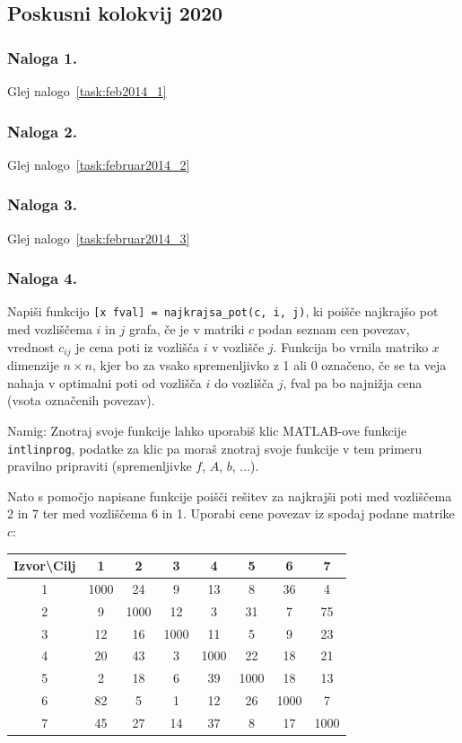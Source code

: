 \documentclass[a4paper,11pt]{article}
\begin{document}
\subsection{Poskusni kolokvij 2020}

\subsubsection{Naloga 1.}

Glej nalogo~\ref{task:feb2014_1}

\subsubsection{Naloga 2.}

Glej nalogo~\ref{task:februar2014_2}

\subsubsection{Naloga 3.}

Glej nalogo~\ref{task:februar2014_3}

\subsubsection{Naloga 4.}

Napiši funkcijo \texttt{[x fval] = najkrajsa\_pot(c, i, j)}, ki poišče najkrajšo pot med vozliščema $i$ in $j$ grafa, če je v matriki $c$ podan seznam cen povezav, vrednost $c_{ij}$ je cena poti iz vozlišča $i$ v vozlišče $j$. Funkcija bo vrnila matriko $x$ dimenzije $n\times n$, kjer bo za vsako spremenljivko z 1 ali 0 označeno, če se ta veja nahaja v optimalni poti od vozlišča $i$ do vozlišča $j$, fval pa bo najnižja cena (vsota označenih povezav).

Namig: Znotraj svoje funkcije lahko uporabiš klic MATLAB-ove funkcije \texttt{intlinprog}, podatke za klic pa moraš znotraj svoje funkcije v tem primeru pravilno pripraviti (spremenljivke $f$, $A$, $b$, ...).

Nato s pomočjo napisane funkcije poišči rešitev za najkrajši poti med vozliščema 2 in 7 ter med vozliščema 6 in 1. Uporabi cene povezav iz spodaj podane matrike $c$:

\begin{table}[hbt] \centering
\begin{tabular}{| c |  c |  c |  c |  c |  c |  c |  c | }
\hline
Izvor\textbackslash Cilj & 1 & 2 & 3 & 4 & 5 & 6 & 7 \\
\hline
1 & 1000 & 24 & 9 & 13 & 8 & 36 & 4 \\
\hline
2 & 9 & 1000 & 12 & 3 & 31 & 7 & 75 \\
\hline
3 & 12 & 16 & 1000 & 11 & 5 & 9 & 23 \\
\hline
4 & 20 & 43 & 3 & 1000 & 22 & 18 & 21 \\
\hline
5 & 2 & 18 & 6 & 39 & 1000 & 18 & 13 \\
\hline
6 & 82 & 5 & 1 & 12 & 26 & 1000 & 7 \\
\hline
7 & 45 & 27 & 14 & 37 & 8 & 17 & 1000 \\
\hline
\end{tabular}
\end{table}
\end{document}
